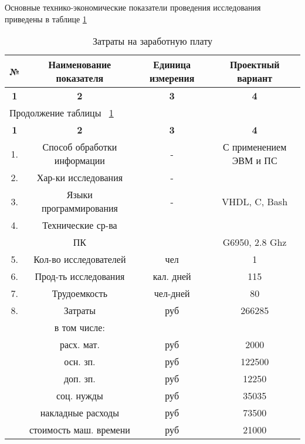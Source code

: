Основные технико-экономические показатели проведения исследования приведены в таблице \ref{tab:eco_osn_tepp} 

\begin{center}
\begin{longtable}{|c|c|c|c|}
\caption{Затраты на заработную плату} \label{tab:eco_osn_tepp} \\ \hline
\multicolumn{1}{|c|}{\textbf{№}} & \multicolumn{1}{c|}{\textbf{Наименование показателя}} & 
\multicolumn{1}{p{3cm}|}{\textbf{Единица измерения}} &   \multicolumn{1}{c|}{\textbf{Проектный вариант}} \\ \hline 

\multicolumn{1}{|c|}{\textbf{1}} &   \multicolumn{1}{c|}{\textbf{2}} & 
\multicolumn{1}{c|}{\textbf{3}} & \multicolumn{1}{c|}{\textbf{4}} \\ \hline
\endfirsthead

\multicolumn{4}{|l|}{{Продолжение таблицы ~\ref{tab:eco_osn_tepp}}} \\ %
\hline
\multicolumn{1}{|c|}{\textbf{1}} &   \multicolumn{1}{c|}{\textbf{2}} & 
\multicolumn{1}{c|}{\textbf{3}} & \multicolumn{1}{c|}{\textbf{4}} \\ \hline
\endhead

\endfoot

\hline
\endlastfoot

1. & Способ обработки информации & - & С применением ЭВМ и ПС  \\ \hline
2. & Хар-ки исследования & - &   \\ \hline
3. & Языки программирования & - & VHDL, C, Bash  \\ \hline
4. & Технические ср-ва & & \\ \hline
   & ПК & & G6950, 2.8 Ghz \\ \hline
5. & Кол-во исследователей & чел & 1  \\ \hline
6. & Прод-ть исследования & кал. дней & 115  \\ \hline
7. & Трудоемкость & чел-дней & 80  \\ \hline
8. & Затраты & руб & 266285  \\ \hline
   & в том числе: &  & \\ \hline
   & расх. мат. & руб & 2000 \\ \hline
   & осн. зп.  & руб & 122500 \\ \hline
   & доп. зп.  & руб & 12250 \\ \hline
   & соц. нужды  & руб & 35035 \\ \hline
   & накладные расходы & руб & 73500 \\ \hline
   & стоимость маш. времени & руб &  21000\\ \hline

\end{longtable}
\end{center}


